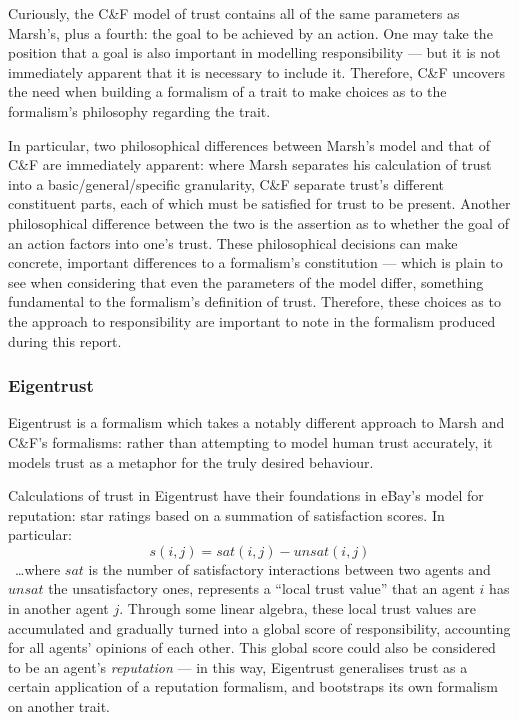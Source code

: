 Curiously, the C\&F model of trust contains all of the same parameters as Marsh's, plus a fourth: the goal to be achieved by an action. One may take the position that a goal is also important in modelling responsibility --- but it is not immediately apparent that it is necessary to include it. Therefore, C\&F uncovers the need when building a formalism of a trait to make choices as to the formalism's philosophy regarding the trait.\par

In particular, two philosophical differences between Marsh's model and that of C\&F are immediately apparent: where Marsh separates his calculation of trust into a basic/general/specific granularity, C\&F separate trust's different constituent parts, each of which must be satisfied for trust to be present. Another philosophical difference between the two is the assertion as to whether the goal of an action factors into one's trust. These philosophical decisions can make concrete, important differences to a formalism's constitution --- which is plain to see when considering that even the parameters of the model differ, something fundamental to the formalism's definition of trust. Therefore, these choices as to the approach to responsibility are important to note in the formalism produced during this report.\par

\subsubsection{Eigentrust}
Eigentrust\cite{eigentrust} is a formalism which takes a notably different approach to Marsh and C\&F's formalisms: rather than attempting to model human trust accurately, it models trust as a metaphor for the truly desired behaviour.\par

Calculations of trust in Eigentrust have their foundations in eBay's model for reputation: star ratings based on a summation of satisfaction scores. In particular: \[s(i,j) = sat(i,j) - unsat(i,j)\]~\ldots{}where \(sat\) is the number of satisfactory interactions between two agents and \(unsat\) the unsatisfactory ones, represents a ``local trust value'' that an agent \(i\) has in another agent \(j\). Through some linear algebra, these local trust values are accumulated and gradually turned into a global score of responsibility, accounting for all agents' opinions of each other. This global score could also be considered to be an agent's \emph{reputation} --- in this way, Eigentrust generalises trust as a certain application of a reputation formalism, and bootstraps its own formalism on another trait.\par

